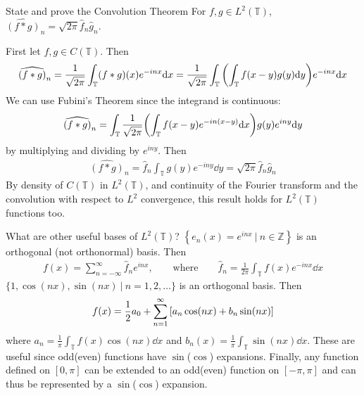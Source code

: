 \documentclass[avery5388,grid,frame]{flashcards}
\def\torus{\mathbb{T}}
\begin{document}
\begin{flashcard}
    {State and prove the Convolution Theorem}
    For $f,g \in L^2(\torus)$, $\widehat{(f*g)}_n = \sqrt{2\pi}\hat{f}_n\hat{g}_n$.

    First let $f,g \in C(\torus)$.  Then
    \vspace{-5pt}
    \begin{align*}
        \widehat{(f*g)}_n = \frac{1}{\sqrt{2\pi}}\int_\torus (f*g)(x) e^{-inx}\dd x = \frac{1}{\sqrt{2\pi}}\int_\torus\qty(\int_\torus f(x - y)g(y)\dd y) e^{-inx} \dd x
    \end{align*}
    \vspace{-5pt}
    We can use Fubini's Theorem since the integrand is continuous:
    \vspace{-5pt}
    \begin{align*}
        \widehat{(f*g)}_n = \int_\torus\frac{1}{\sqrt{2\pi}}\qty(\int_\torus f(x - y)e^{-in(x - y)} \dd x)g(y)e^{iny} \dd y
    \end{align*}
    \vspace{-5pt}
    by multiplying and dividing by $e^{iny}$.  Then
    \vspace{-5pt}
    \begin{align*}
        \widehat{(f*g)}_n = \hat{f}_n\int_\torus g(y)e^{-iny}\dd y = \sqrt{2\pi}\hat{f}_n\hat{g}_n
    \end{align*}
    By density of $C(\torus)$ in $L^2(\torus)$, and continuity of the Fourier transform and the convolution with respect to $L^2$ convergence, this result holds for $L^2(\torus)$ functions too.
\end{flashcard}

\begin{flashcard}
    {What are other useful bases of $L^2(\torus)$?}
    $\left\{e_n(x) = e^{inx}\ |\ n \in \mathbb{Z}\right\}$ is an orthogonal (not orthonormal) basis.  Then
    \begin{align*}
        f(x) = \sum_{n=-\infty}^\infty \hat{f}_n e^{inx}, \qquad \text{where}\qquad \hat{f}_n = \frac{1}{2\pi}\int_\torus f(x) e^{-inx}\dd x
    \end{align*}
    $\{1, \cos(nx), \sin(nx)\ |\ n = 1, 2, \dots\}$ is an orthogonal basis.  Then
    \begin{align*}
        f(x) = \frac{1}{2}a_0 + \sum_{n=1}^\infty \qty[a_n\cos(nx) + b_n \sin(nx)]
    \end{align*}
    where $a_n = \frac{1}{\pi}\int_\torus f(x) \cos(nx)\dd x$ and $b_n(x) = \frac{1}{\pi}\int_\torus \sin(nx) \dd x$.  These are useful since odd(even) functions have $\sin$($\cos$) expansions.  Finally, any function defined on $[0,\pi]$ can be extended to an odd(even) function on $[-\pi,\pi]$ and can thus be represented by a $\sin$($\cos$) expansion.
\end{flashcard}
\end{document}

